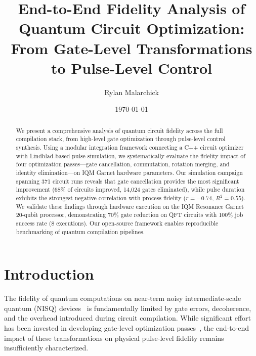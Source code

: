 \documentclass[twocolumn,showpacs,preprintnumbers,amsmath,amssymb,prb]{revtex4-2}
\begin{document}
\title{End-to-End Fidelity Analysis of Quantum Circuit Optimization:\\From Gate-Level Transformations to Pulse-Level Control}

\author{Rylan Malarchick}

\date{\today}

\begin{abstract}
We present a comprehensive analysis of quantum circuit fidelity across the full compilation stack, from high-level gate optimization through pulse-level control synthesis. Using a modular integration framework connecting a C++ circuit optimizer with Lindblad-based pulse simulation, we systematically evaluate the fidelity impact of four optimization passes---gate cancellation, commutation, rotation merging, and identity elimination---on IQM Garnet hardware parameters. Our simulation campaign spanning 371 circuit runs reveals that gate cancellation provides the most significant improvement (68\% of circuits improved, 14,024 gates eliminated), while pulse duration exhibits the strongest negative correlation with process fidelity ($r = -0.74$, $R^2 = 0.55$). We validate these findings through hardware execution on the IQM Resonance Garnet 20-qubit processor, demonstrating 70\% gate reduction on QFT circuits with 100\% job success rate (8 executions). Our open-source framework enables reproducible benchmarking of quantum compilation pipelines.
\end{abstract}

\maketitle

\section{Introduction}
\label{sec:introduction}

The fidelity of quantum computations on near-term noisy intermediate-scale quantum (NISQ) devices~\cite{preskill2018quantum} is fundamentally limited by gate errors, decoherence, and the overhead introduced during circuit compilation. While significant effort has been invested in developing gate-level optimization passes~\cite{nam2018automated,kissinger2020reducing,lubasch2025tensor}, the end-to-end impact of these transformations on physical pulse-level fidelity remains insufficiently characterized.
\end{document}
